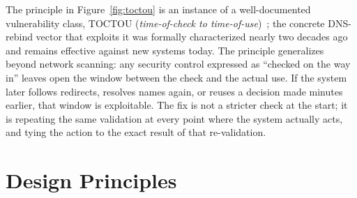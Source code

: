 \documentclass[10pt]{article}
\begin{document}
The principle in Figure~\ref{fig:toctou} is an instance of a well-documented vulnerability class, TOCTOU (\emph{time-of-check to time-of-use})~\cite{cwe367}; the concrete DNS-rebind vector that exploits it was formally characterized nearly two decades ago~\cite{dnsrebind2007} and remains effective against new systems today. The principle generalizes beyond network scanning: any security control expressed as ``checked on the way in'' leaves open the window between the check and the actual use. If the system later follows redirects, resolves names again, or reuses a decision made minutes earlier, that window is exploitable. The fix is not a stricter check at the start; it is repeating the same validation at every point where the system actually acts, and tying the action to the exact result of that re-validation.

\section{Design Principles}
\end{document}
